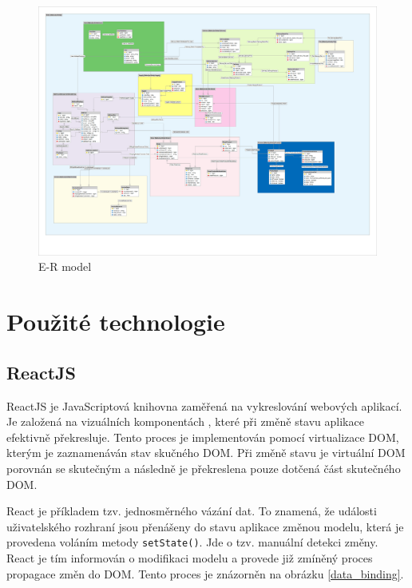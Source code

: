 \documentclass[thesis=B,czech]{FITthesis}[2012/06/26]
\begin{document}
\begin{figure}
	\includegraphics[width=500pt, height=\textwidth, angle=90]{mahasys_ermodel.png}
	\caption{E-R model}\label{er_model}
\end{figure}
	
\section{Použité technologie}

\subsection{ReactJS}
	ReactJS je JavaScriptová knihovna zaměřená na vykreslování webových aplikací. Je založená na vizuálních komponentách \cite{reactjs}, které při změně stavu aplikace efektivně překresluje. Tento proces je implementován pomocí virtualizace DOM, kterým je zaznamenáván stav skučného DOM. Při změně stavu je virtuální DOM porovnán se skutečným a následně je překreslena pouze dotčená část skutečného DOM. \cite{react-crud-app}
	
	React je příkladem tzv. jednosměrného vázání dat. To znamená, že události uživatelského rozhraní jsou přenášeny do stavu aplikace   změnou modelu, která je provedena voláním metody \verb|setState()|. Jde o tzv. manuální detekci změny. React je tím informován o modifikaci modelu a provede již zmíněný proces propagace změn do DOM.\cite{data_binding} Tento proces je znázorněn na obrázku \ref{data_binding}.
	
\end{document}
